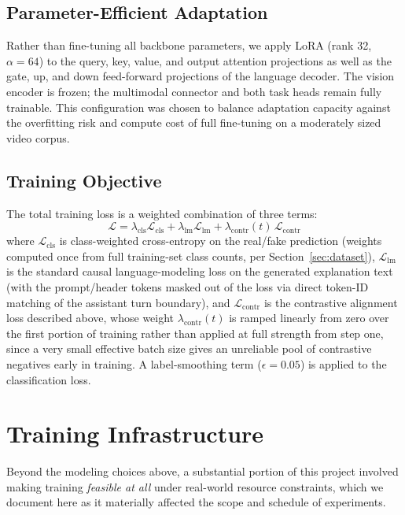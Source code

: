 \documentclass[acmsmall,review=false]{acmart}
\begin{document}
\subsection{Parameter-Efficient Adaptation}

Rather than fine-tuning all backbone parameters, we apply LoRA
\citep{hu2021lora} (rank 32, $\alpha=64$) to the query, key, value, and output
attention projections as well as the gate, up, and down feed-forward
projections of the language decoder. The vision encoder is frozen; the
multimodal connector and both task heads remain fully trainable. This
configuration was chosen to balance adaptation capacity against the
overfitting risk and compute cost of full fine-tuning on a moderately sized
video corpus.

\subsection{Training Objective}

The total training loss is a weighted combination of three terms:
\begin{equation}
\mathcal{L} = \lambda_{\text{cls}} \mathcal{L}_{\text{cls}} + \lambda_{\text{lm}} \mathcal{L}_{\text{lm}} + \lambda_{\text{contr}}(t) \, \mathcal{L}_{\text{contr}}
\end{equation}
where $\mathcal{L}_{\text{cls}}$ is class-weighted cross-entropy on the
real/fake prediction (weights computed once from full training-set class
counts, per Section~\ref{sec:dataset}), $\mathcal{L}_{\text{lm}}$ is the
standard causal language-modeling loss on the generated explanation text (with
the prompt/header tokens masked out of the loss via direct token-ID
matching of the assistant turn boundary), and $\mathcal{L}_{\text{contr}}$ is
the contrastive alignment loss described above, whose weight $\lambda_{\text{contr}}(t)$
is ramped linearly from zero over the first portion of training rather than
applied at full strength from step one, since a very small effective batch
size gives an unreliable pool of contrastive negatives early in training. A
label-smoothing term ($\epsilon = 0.05$) is applied to the classification loss.

\section{Training Infrastructure}
\label{sec:infra}

Beyond the modeling choices above, a substantial portion of this project
involved making training \emph{feasible at all} under real-world resource
constraints, which we document here as it materially affected the scope and
schedule of experiments.
\end{document}
